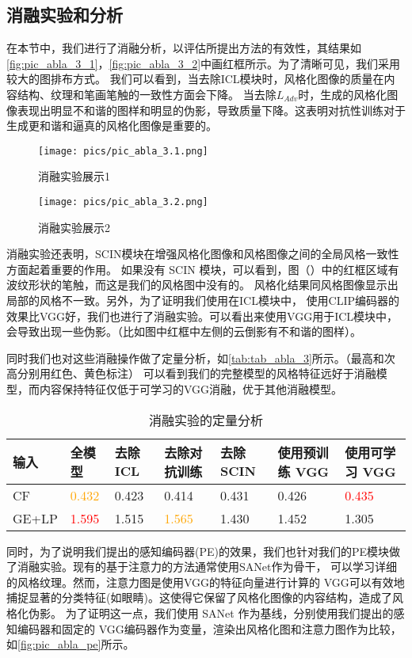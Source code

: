 \subsection{消融实验和分析}
在本节中，我们进行了消融分析，以评估所提出方法的有效性，其结果如\autoref{fig:pic_abla_3_1}，\autoref{fig:pic_abla_3_2}中画红框所示。为了清晰可见，我们采用较大的图排布方式。
我们可以看到，当去除ICL模块时，风格化图像的质量在内容结构、纹理和笔画笔触的一致性方面会下降。
当去除$L_{Adv}$时，生成的风格化图像表现出明显不和谐的图样和明显的伪影，导致质量下降。这表明对抗性训练对于生成更和谐和逼真的风格化图像是重要的。

\begin{figure}[htbp]
    \centering
    \texttt{[image: pics/pic\_abla\_3.1.png]}
    \caption{\label{fig:pic_abla_3_1}消融实验展示1}
\end{figure}
\begin{figure}[htbp]
    \centering
    \texttt{[image: pics/pic\_abla\_3.2.png]}
    \caption{\label{fig:pic_abla_3_2}消融实验展示2}
\end{figure}
消融实验还表明，SCIN模块在增强风格化图像和风格图像之间的全局风格一致性方面起着重要的作用。
如果没有 SCIN 模块，可以看到，图（）中的红框区域有波纹形状的笔触，而这是我们的风格图中没有的。
风格化结果同风格图像显示出局部的风格不一致。另外，为了证明我们使用在ICL模块中，
使用CLIP编码器的效果比VGG好，我们也进行了消融实验。可以看出来使用VGG用于ICL模块中，会导致出现一些伪影。（比如图中红框中左侧的云倒影有不和谐的图样）。
\par 同时我们也对这些消融操作做了定量分析，如\autoref{tab:tab_abla_3}所示。（最高和次高分别用红色、黄色标注）
可以看到我们的完整模型的风格特征远好于消融模型，而内容保持特征仅低于可学习的VGG消融，优于其他消融模型。

\begin{table}[htbp]
    \caption{\label{tab:tab_abla_3}消融实验的定量分析}
    \begin{tabularx}{\linewidth}{X<{\centering}|X<{\centering}|X<{\centering}|X<{\centering}|X<{\centering}|X<{\centering}|X<{\centering}}
        \hline
        输入   & 全模型 & 去除 ICL & 去除对抗训练 & 去除 SCIN & 使用预训练 VGG & 使用可学习 VGG \\ \hline

        CF    & \textcolor{orange}{0.432}  & 0.423 & 0.414 & 0.431 & 0.426 & \textcolor{red}{0.435}  \\ \hline
        GE+LP & \textcolor{red}{1.595} & 1.515 & \textcolor{orange}{1.565} & 1.430 & 1.452 & 1.305 \\ \hline

    \end{tabularx}
\end{table}
\par 同时，为了说明我们提出的感知编码器(PE)的效果，我们也针对我们的PE模块做了消融实验。现有的基于注意力的方法通常使用SANet作为骨干，
可以学习详细的风格纹理。然而，注意力图是使用VGG的特征向量进行计算的
VGG可以有效地捕捉显著的分类特征(如眼睛)。这使得它保留了风格化图像的内容结构，造成了风格化伪影。
为了证明这一点，我们使用 SANet 作为基线，分别使用我们提出的感知编码器和固定的 VGG编码器作为变量，渲染出风格化图和注意力图作为比较，如\autoref{fig:pic_abla_pe}所示。

